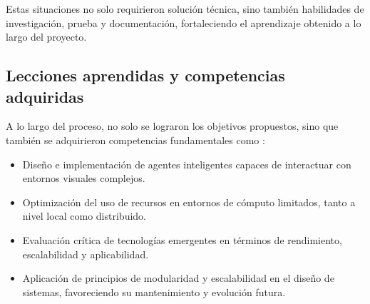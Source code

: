 Estas situaciones no solo requirieron solución técnica, sino también habilidades de investigación, prueba y documentación, fortaleciendo el aprendizaje obtenido a lo largo del proyecto.

\subsection{Lecciones aprendidas y competencias adquiridas}

A lo largo del proceso, no solo se lograron los objetivos propuestos, sino que también se adquirieron competencias fundamentales como :

\begin{itemize}
    \item Diseño e implementación de agentes inteligentes capaces de interactuar con entornos visuales complejos.
    \item Optimización del uso de recursos en entornos de cómputo limitados, tanto a nivel local como distribuido.
    \item Evaluación crítica de tecnologías emergentes en términos de rendimiento, escalabilidad y aplicabilidad.
    \item Aplicación de principios de modularidad y escalabilidad en el diseño de sistemas, favoreciendo su mantenimiento y evolución futura.
\end{itemize}
